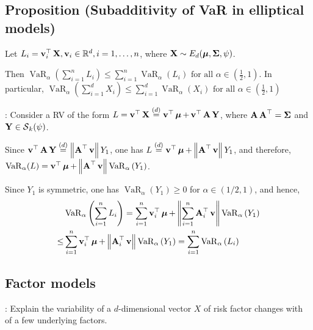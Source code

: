 \subsection*{Proposition (Subadditivity of VaR in elliptical models)}
Let $L_{i}=\v_{i}^{\T} \X, \v_{i} \in \mathbb{R}^{d}, i=1, \ldots, n$, where $\X \sim E_{d}(\mmu, \mSigma, \psi)$. 

Then
$
\displaystyle \operatorname{VaR}_{\alpha}\left(\sum_{i=1}^{n} L_{i}\right) \leq \sum_{i=1}^{n} \operatorname{VaR}_{\alpha}\left(L_{i}\right) \text { for all } \alpha \in(\frac{1}{2},1)
$. In particular,
$
\displaystyle \operatorname{VaR}_{\alpha}\left(\sum_{i=1}^{d} X_{i}\right) \leq \sum_{i=1}^{d} \operatorname{VaR}_{\alpha}\left(X_{i}\right) \text { for all } \alpha \in(\frac{1}{2},1)
$




: Consider a RV of the form $L=\v^{\T} \X \stackrel{(d)}{=} \v^{\T} \mmu+\v^{\T} \A \Y$, where $\A \A^{\T}=\mSigma$ and $\Y \in \S_{k}(\psi)$.

Since $\v^{\T} \A \Y \stackrel{(d)}{=}\left\|\A^{\T} \v\right\| Y_{1}$, one has $L \stackrel{(d)}{=} \v^{\T} \mmu+\left\|\A^{\T} \v\right\| Y_{1}$, and therefore,
$
\operatorname{VaR}_{\alpha}(L)=\v^{\T} \mmu+\left\|\A^{\T} \v\right\| \operatorname{VaR}_{\alpha}\left(Y_{1}\right)
$.


Since $Y_{1}$ is symmetric, one has $\operatorname{VaR}_{\alpha}\left(Y_{1}\right) \geq 0$ for $\alpha \in(1 / 2,1)$, and hence,
$$
\begin{aligned}
&\operatorname{VaR}_{\alpha}\left(\sum_{i=1}^{n} L_{i}\right)=\sum_{i=1}^{n} \v_{i}^{\T} \mmu+\left\|\sum_{i=1}^{n} \A_{i}^{\T} \v \right\| \operatorname{VaR}_{\alpha}\left(Y_{1}\right) \\
\leq &\sum_{i=1}^{n} \v_{i}^{\T} \mmu+\left\|\A_{i}^{\T} \v\right\| \operatorname{VaR}_{\alpha}\left(Y_{1}\right)=\sum_{i=1}^{n} \operatorname{VaR}_{\alpha}\left(L_{i}\right)
\end{aligned}
$$




\subsection*{Factor models}
: Explain the variability of a $d$-dimensional vector $X$ of risk factor changes with of a few underlying factors.

